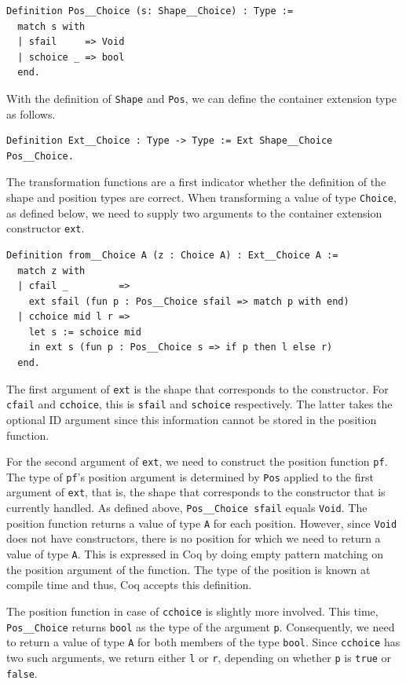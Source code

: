 \documentclass[a4paper, 11pt, fleqn, twoside, abstract=on]{scrreprt}
\newcommand{\cinl}[1]{\texttt{#1}}
\begin{document}
\begin{verbatim}
Definition Pos__Choice (s: Shape__Choice) : Type :=
  match s with
  | sfail     => Void
  | schoice _ => bool
  end.
\end{verbatim}

With the definition of \cinl{Shape} and \cinl{Pos}, we can define the container extension type as follows.

\begin{verbatim}
Definition Ext__Choice : Type -> Type := Ext Shape__Choice Pos__Choice.
\end{verbatim}

The transformation functions are a first indicator whether the definition of the shape and position types are correct.
When transforming a value of type \cinl{Choice}, as defined below, we need to supply two arguments to the container extension constructor \cinl{ext}.

\begin{verbatim}
Definition from__Choice A (z : Choice A) : Ext__Choice A :=
  match z with
  | cfail _         =>
    ext sfail (fun p : Pos__Choice sfail => match p with end)
  | cchoice mid l r =>
    let s := schoice mid
    in ext s (fun p : Pos__Choice s => if p then l else r)
  end.
\end{verbatim}

The first argument of \cinl{ext} is the shape that corresponds to the constructor.
For \cinl{cfail} and \cinl{cchoice}, this is \cinl{sfail} and \cinl{schoice} respectively.
The latter takes the optional ID argument since this information cannot be stored in the position function.

For the second argument of \cinl{ext}, we need to construct the position function \cinl{pf}.
The type of \cinl{pf}'s position argument is determined by \cinl{Pos} applied to the first argument of \cinl{ext}, that is, the shape that corresponds to the constructor that is currently handled.
As defined above, \cinl{Pos__Choice sfail} equals \cinl{Void}.
The position function returns a value of type \cinl{A} for each position.
However, since \cinl{Void} does not have constructors, there is no position for which we need to return a value of type \cinl{A}. 
This is expressed in Coq by doing empty pattern matching on the position argument of the function.
The type of the position is known at compile time and thus, Coq accepts this definition.

The position function in case of \cinl{cchoice} is slightly more involved.
This time, \cinl{Pos__Choice} returns \cinl{bool} as the type of the argument \cinl{p}.
Consequently, we need to return a value of type \cinl{A} for both members of the type \cinl{bool}.
Since \cinl{cchoice} has two such arguments, we return either \cinl{l} or \cinl{r}, depending on whether \cinl{p} is \cinl{true} or \cinl{false}.
\end{document}
